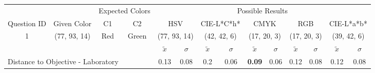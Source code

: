 \begin{table}[H]
  \resizebox{\textwidth}{!} {
  \begin{tabular}{lccccccccccccc}
    \hline
    \multicolumn{1}{c}{}                              &                                      & \multicolumn{2}{c}{Expected Colors}                   & \multicolumn{10}{c}{Possible Results}                                                                                                                                                                                                                                                                                        \\ \cline{3-14}
    \multicolumn{1}{c}{\multirow{-2}{*}{Question ID}} & \multirow{-2}{*}{Given Color}        & C1                       & C2                         & \multicolumn{2}{c}{HSV}                                        & \multicolumn{2}{c}{CIE-L*C*h*}                                 & \multicolumn{2}{c}{CMYK}                                       & \multicolumn{2}{c}{RGB}                                        & \multicolumn{2}{c}{CIE-L*a*b*}                                 \\ \hline
    \multicolumn{1}{c}{1}                             & \cellcolor[HTML]{FFFF00}(77, 93, 14) & \multicolumn{1}{c|}{Red} & \multicolumn{1}{c|}{Green} & \multicolumn{2}{c|}{\cellcolor[HTML]{FFFF00}(77, 93, 14)}      & \multicolumn{2}{c|}{\cellcolor[HTML]{D7A700}(42, 42, 6)}       & \multicolumn{2}{c|}{\cellcolor[HTML]{808000}(17, 20, 3)}       & \multicolumn{2}{c|}{\cellcolor[HTML]{808000}(17, 20, 3)}       & \multicolumn{2}{c|}{\cellcolor[HTML]{C9AB00}(39, 42, 6)}       \\ \hline
                                                      & \multicolumn{1}{l}{}                 & \multicolumn{1}{l}{}     & \multicolumn{1}{l}{}       & \multicolumn{1}{c}{$\tilde{x}$} & \multicolumn{1}{c}{$\sigma$} & \multicolumn{1}{c}{$\tilde{x}$} & \multicolumn{1}{c}{$\sigma$} & \multicolumn{1}{c}{$\tilde{x}$} & \multicolumn{1}{c}{$\sigma$} & \multicolumn{1}{c}{$\tilde{x}$} & \multicolumn{1}{c}{$\sigma$} & \multicolumn{1}{c}{$\tilde{x}$} & \multicolumn{1}{c}{$\sigma$} \\ \hline
    \multicolumn{4}{l}{Distance to Objective - Laboratory}                                                                                           & \multicolumn{1}{|c}{0.13}       & \multicolumn{1}{c|}{0.08}    & \multicolumn{1}{|c}{0.2}        & \multicolumn{1}{c|}{0.06}    & \multicolumn{1}{|c}{\textbf{0.09}}       & \multicolumn{1}{c|}{0.06}    & \multicolumn{1}{|c}{0.12}       & \multicolumn{1}{c|}{0.08}    & \multicolumn{1}{|c}{0.12}       & \multicolumn{1}{c|}{0.08}    \\

\end{tabular}}
\end{table}
